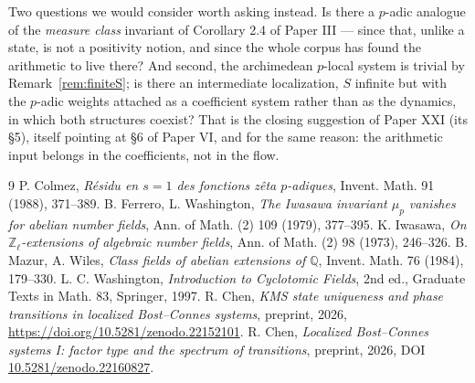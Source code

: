 \documentclass[11pt]{amsart}
\numberwithin{equation}{section}
\theoremstyle{definition}
\theoremstyle{remark}
\newcommand{\Z}{\mathbb{Z}}
\newcommand{\Q}{\mathbb{Q}}
\begin{document}
Two questions we would consider worth asking instead. Is there a $p$-adic analogue of the
\emph{measure class} invariant of Corollary 2.4 of Paper III --- since that, unlike a state,
is not a positivity notion, and since the whole corpus has found the arithmetic to live
there? And second, the archimedean $p$-local system is trivial by
Remark~\ref{rem:finiteS}; is there an intermediate localization, $S$ infinite but with the
$p$-adic weights attached as a coefficient system rather than as the dynamics, in which both
structures coexist? That is the closing suggestion of Paper XXI (its \S5), itself pointing
at \S6 of Paper VI, and for the same
reason: the arithmetic input belongs in the coefficients, not in the flow.

\begin{thebibliography}{9}
 P. Colmez, \emph{R\'esidu en $s=1$ des fonctions z\^eta $p$-adiques}, Invent. Math. 91 (1988), 371--389.
 B. Ferrero, L. Washington, \emph{The Iwasawa invariant $\mu_p$ vanishes for abelian number fields}, Ann. of Math. (2) 109 (1979), 377--395.
 K. Iwasawa, \emph{On $\Z_\ell$-extensions of algebraic number fields}, Ann. of Math. (2) 98 (1973), 246--326.
 B. Mazur, A. Wiles, \emph{Class fields of abelian extensions of $\Q$}, Invent. Math. 76 (1984), 179--330.
 L. C. Washington, \emph{Introduction to Cyclotomic Fields}, 2nd ed., Graduate Texts in Math. 83, Springer, 1997.
 R. Chen, \emph{KMS state uniqueness and phase transitions in localized Bost--Connes systems}, preprint, 2026, \newline\url{https://doi.org/10.5281/zenodo.22152101}.
 R. Chen, \emph{Localized Bost--Connes systems I: factor type and the spectrum of transitions}, preprint, 2026, DOI \href{https://doi.org/10.5281/zenodo.22160827}{10.5281/zenodo.22160827}.
\end{thebibliography}
\end{document}
